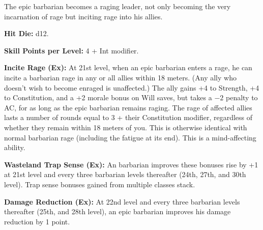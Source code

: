 
The epic barbarian becomes a raging leader, not only becoming the very incarnation of rage but inciting rage into his allies. 

\textbf{Hit Die:} d12.

\textbf{Skill Points per Level:} 4 + Int modifier.

\textbf{Incite Rage (Ex):} At 21st level, when an epic barbarian enters a rage, he can incite a barbarian rage in any or all allies within 18 meters. (Any ally who doesn't wish to become enraged is unaffected.) The ally gains +4 to Strength, +4 to Constitution, and a +2 morale bonus on Will saves, but takes a $-2$ penalty to AC, for as long as the epic barbarian remains raging. The rage of affected allies lasts a number of rounds equal to 3 + their Constitution modifier, regardless of whether they remain within 18 meters of you. This is otherwise identical with normal barbarian rage (including the fatigue at its end). This is a mind-affecting ability.

\textbf{Wasteland Trap Sense (Ex):} An barbarian improves these bonuses rise by +1 at 21st level and every three barbarian levels thereafter (24th, 27th, and 30th level). Trap sense bonuses gained from multiple classes stack.

\textbf{Damage Reduction (Ex):} At 22nd level and every three barbarian levels thereafter (25th, and 28th level), an epic barbarian improves his damage reduction by 1 point.

